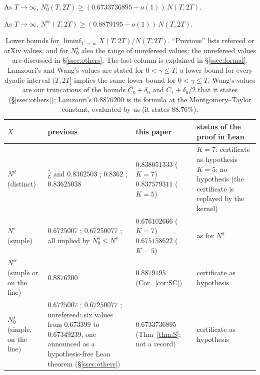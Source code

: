 \begin{theorem}\label{thm:S}
As $T\to\infty$, $N_0^s(T,2T)\ge(0.6733736895-o(1))\,N(T,2T)$.
\end{theorem}

\begin{corollary}\label{cor:SC}
As $T\to\infty$, $N^{\mathrm{sc}}(T,2T)\ge(0.8879195-o(1))\,N(T,2T)$.
\end{corollary}

\begin{table}[ht]\centering\small
\caption{Lower bounds for $\liminf_{T\to\infty}X(T,2T)/N(T,2T)$. ``Previous'' lists refereed or arXiv values, and for $N_0^s$ also the
range of unrefereed values; the unrefereed values are discussed in \S\ref{ssec:others}. The last column is explained in \S\ref{ssec:formal}.
Lamzouri's and Wang's values are stated for $0<\gamma\le T$; a lower bound for every dyadic interval $(T,2T]$ implies the same lower bound for
$0<\gamma\le T$. Wang's values are our truncations of the bounds $C_0+\delta_0$ and $C_1+\delta_0/2$ that it states (\S\ref{ssec:others});
Lamzouri's $0.8876200$ is its formula at the Montgomery--Taylor constant, evaluated by us (it states $88.76\%$).}\label{tab:results}
\begin{tabular}{@{}>{\raggedright\arraybackslash}p{2.4cm}>{\raggedright\arraybackslash}p{4.4cm}>{\raggedright\arraybackslash}p{3.5cm}>{\raggedright\arraybackslash}p{4.2cm}@{}}
\toprule
$X$ & previous & this paper & status of the proof in Lean \\
\midrule
$N^d$ (distinct) & $\frac56$ and $0.8362503$ \cite{AF}; $0.8362$ \cite{Lamzouri}; $0.83625038$ \cite{Wang24167} &
$\mathbf{0.838051333}$ ($K=7$)\newline $\mathbf{0.837579311}$ ($K=5$) &
$K=7$: certificate as hypothesis\newline $K=5$: no hypothesis (the certificate is replayed by the kernel)\\[3pt]
$N^s$ (simple) & $0.6725007$ \cite{AF,Lamzouri}; $0.67250077$ \cite{Wang24167}; all implied by $N_0^s\le N^s$ &
$\mathbf{0.676102666}$ ($K=7$)\newline $\mathbf{0.675158622}$ ($K=5$) & as for $N^d$\\[3pt]
$N^{\mathrm{sc}}$ (simple or on the line) & $0.8876200$ \cite{Lamzouri} & $0.8879195$ (Cor.~\ref{cor:SC}) & certificate as hypothesis\\[3pt]
$N_0^s$ (simple, on the line) & $0.6725007$ \cite{AF,Lamzouri}; $0.67250077$ \cite{Wang24167}; unrefereed: six values from $0.673399$ to
$0.67349239$, one announced as a hypothesis-free Lean theorem (\S\ref{ssec:others}) & $0.6733736895$ (Thm~\ref{thm:S}; not a record) & certificate as hypothesis\\
\bottomrule
\end{tabular}
\end{table}

